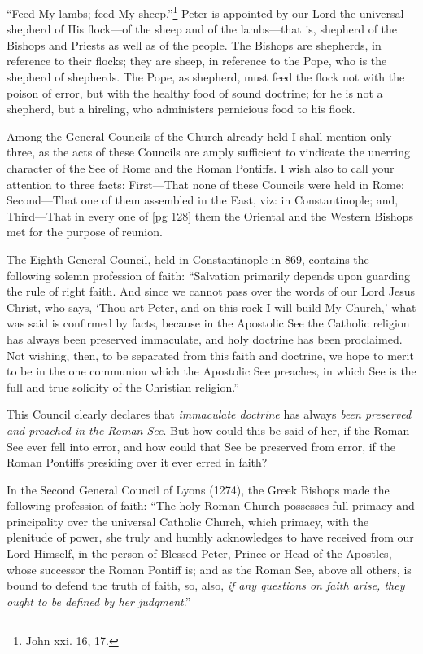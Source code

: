 “Feed My lambs; feed My sheep.”\footnote{John
xxi. 16, 17.} Peter is
appointed by our Lord the universal shepherd of
His flock—of the sheep and of the lambs—that
is, shepherd of the Bishops and Priests as well
as of the people. The Bishops are shepherds, in
reference to their flocks; they are sheep, in reference
to the Pope, who is the shepherd of shepherds.
The Pope, as shepherd, must feed the flock
not with the poison of error, but with the healthy
food of sound doctrine; for he is not a shepherd,
but a hireling, who administers pernicious food
to his flock.

Among the General Councils of the Church already
held I shall mention only three, as the acts
of these Councils are amply sufficient to vindicate
the unerring character of the See of Rome and
the Roman Pontiffs. I wish also to call your
attention to three facts: First—That none of
these Councils were held in Rome; Second—That
one of them assembled in the East, viz: in Constantinople;
and, Third—That in every one of
[pg 128]
them the Oriental and the Western Bishops met
for the purpose of reunion.

The Eighth General Council, held in Constantinople
in 869, contains the following solemn profession
of faith: “Salvation primarily depends
upon guarding the rule of right faith. And since
we cannot pass over the words of our Lord Jesus
Christ, who says, ‘Thou art Peter, and on this
rock I will build My Church,’ what was said is
confirmed by facts, because in the Apostolic See
the Catholic religion has always been preserved
immaculate, and holy doctrine has been proclaimed.
Not wishing, then, to be separated from
this faith and doctrine, we hope to merit to be in
the one communion which the Apostolic See
preaches, in which See is the full and true solidity
of the Christian religion.”

This Council clearly declares that \emph{immaculate
doctrine} has always \emph{been preserved and preached
in the Roman See}. But how could this be said of
her, if the Roman See ever fell into error, and how
could that See be preserved from error, if the
Roman Pontiffs presiding over it ever erred in
faith?

In the Second General Council of Lyons (1274),
the Greek Bishops made the following profession
of faith: “The holy Roman Church possesses full
primacy and principality over the universal Catholic
Church, which primacy, with the plenitude of
power, she truly and humbly acknowledges to
have received from our Lord Himself, in the person
of Blessed Peter, Prince or Head of the Apostles,
whose successor the Roman Pontiff is; and
as the Roman See, above all others, is bound to
defend the truth of faith, so, also, \emph{if any questions
on faith arise, they ought to be defined by
her judgment}.”

